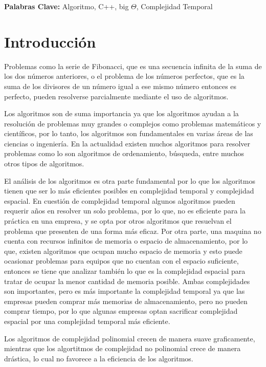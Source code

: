 \documentclass[12pt,twoside]{article}
\begin{document}
{\bf Palabras Clave:} Algoritmo, C++, big $\Theta$, Complejidad Temporal

\newpage
\section{Introducci\'on}
Problemas como la serie de Fibonacci, que es una secuencia infinita de la suma de los dos números anteriores\cite{fibo}, o el problema de los números perfectos, que es la suma de los divisores de un número igual a ese mismo número entonces es perfecto\cite{key}, pueden resolverse parcialmente mediante el uso de algoritmos.
\medskip


Los algoritmos son de suma importancia ya que los algoritmos ayudan a la resolución de problemas muy grandes o complejos como problemas matemáticos y científicos, por lo tanto, los algoritmos son fundamentales en varias áreas de las ciencias o ingeniería. En la actualidad existen muchos algoritmos para resolver problemas como lo son algoritmos de ordenamiento, búsqueda, entre muchos otros tipos de algoritmos. 
\medskip

El análisis de los algoritmos es otra parte fundamental por lo que los algoritmos tienen que ser lo más eficientes posibles en complejidad temporal y complejidad espacial. En cuestión de complejidad temporal algunos algoritmos pueden requerir años en resolver un solo problema, por lo que, no es eficiente para la práctica en una empresa, y se opta por otros algoritmos que resuelvan el problema que presenten de una forma más eficaz. Por otra parte, una maquina no cuenta con recursos infinitos de memoria o espacio de almacenamiento, por lo que, existen algoritmos que ocupan mucho espacio de memoria y esto puede ocasionar problemas para equipos que no cuentan con el espacio suficiente, entonces se tiene que analizar también lo que es la complejidad espacial para tratar de ocupar la menor cantidad de memoria posible. Ambas complejidades son importantes, pero es más importante la complejidad temporal ya que las empresas pueden comprar más memorias de almacenamiento, pero no pueden comprar tiempo, por lo que algunas empresas optan sacrificar complejidad espacial por una complejidad temporal más eficiente.
\medskip

Los algoritmos de complejidad polinomial crecen de manera suave graficamente, mientras que los algortitmos de complejidad no polinomial crece de manera drástica, lo cual no favorece a la eficiencia de los algoritmos.
\end{document}
